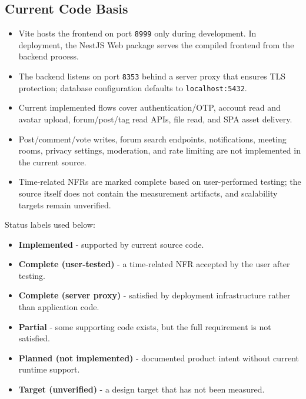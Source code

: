 \documentclass[12pt]{article}
\begin{document}
\subsection*{Current Code Basis}
\par\medskip

\begin{itemize}
\item Vite hosts the frontend on port \texttt{8999} only during development. In deployment, the NestJS Web package serves the compiled frontend from the backend process.
\item The backend listens on port \texttt{8353} behind a server proxy that ensures TLS protection; database configuration defaults to \texttt{localhost:5432}.
\item Current implemented flows cover authentication/OTP, account read and avatar upload, forum/post/tag read APIs, file read, and SPA asset delivery.
\item Post/comment/vote writes, forum search endpoints, notifications, meeting rooms, privacy settings, moderation, and rate limiting are not implemented in the current source.
\item Time-related NFRs are marked complete based on user-performed testing; the source itself does not contain the measurement artifacts, and scalability targets remain unverified.
\end{itemize}
\par\medskip

Status labels used below:
\par\medskip

\begin{itemize}
\item \textbf{Implemented} - supported by current source code.
\item \textbf{Complete (user-tested)} - a time-related NFR accepted by the user after testing.
\item \textbf{Complete (server proxy)} - satisfied by deployment infrastructure rather than application code.
\item \textbf{Partial} - some supporting code exists, but the full requirement is not satisfied.
\item \textbf{Planned (not implemented)} - documented product intent without current runtime support.
\item \textbf{Target (unverified)} - a design target that has not been measured.
\end{itemize}
\par\medskip
\end{document}
